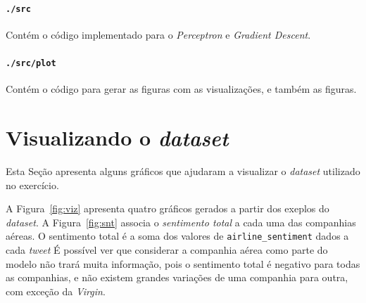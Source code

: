 \documentclass[a4paper, 12pt]{article}
\begin{document}
\paragraph{\texttt{./src}} Contém o código implementado
para o \textit{Perceptron} e \textit{Gradient Descent}.

\paragraph{\texttt{./src/plot}} Contém o código para
gerar as figuras com as visualizações, e também as figuras.

\section{Visualizando o \textit{dataset}} \label{sec:viz}

Esta Seção apresenta alguns gráficos que ajudaram a visualizar
o \textit{dataset} utilizado no exercício.

A Figura~\ref{fig:viz} apresenta quatro gráficos gerados a partir dos exeplos
do \textit{dataset}. A Figura~\ref{fig:snt} associa o \textit{sentimento total}
a cada uma das companhias aéreas.  O sentimento total é a soma dos valores de
\texttt{airline\_sentiment} dados a cada \textit{tweet} É possível ver que
considerar a companhia aérea como parte do modelo não trará muita informação,
pois o sentimento total é negativo para todas as companhias, e não existem
grandes variações de uma companhia para outra, com exceção da \textit{Virgin}.
\end{document}
